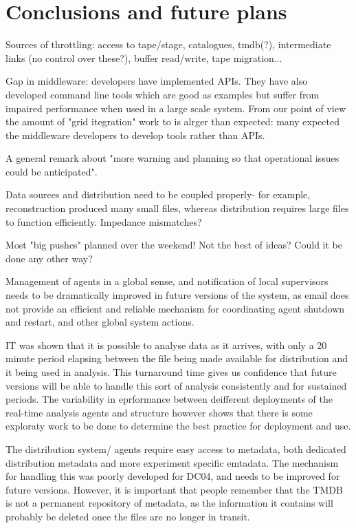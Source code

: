 \documentclass{cmspaper}
\begin{document}
\section{Conclusions and future plans}


Sources of throttling: access to tape/stage, catalogues, tmdb(?), intermediate links (no control over these?), buffer read/write, tape migration...

Gap in middleware: developers have implemented APIs. They have also developed command line tools which are good as examples but suffer from impaired performance when used in a large scale system. From our point of view the amount of "grid itegration" work to is alrger than expected: many expected the middleware developers to develop tools rather than APIs.

A general remark about "more warning and planning so that operational issues could be anticipated".

Data sources and distribution need to be coupled properly- for example, reconstruction produced many small files, whereas distribution requires large files to function efficiently. Impedance mismatches?

Most "big pushes" planned over the weekend! Not the best of ideas? Could it be done any other way?

Management of agents in a global sense, and notification of local supervisors needs to be dramatically improved in future versions of the system, as email does not provide an efficient and reliable mechanism for coordinating agent shutdown and restart, and other global system actions.

IT was shown that it is possible to analyse data as it arrives, with only a 20 minute period elapsing between the file being made available for distribution and it being used in analysis. This turnaround time gives us confidence that future versions will be able to handle this sort of analysis consistently and for sustained periods. The variability in eprformance between deifferent deployments of the real-time analysis agents and structure however shows that there is some exploraty work to be done to determine the best practice for deployment and use.

The distribution system/ agents require easy access to metadata, both dedicated distribution metadata and more experiment specific emtadata. The mechanism for handling this was poorly developed for DC04, and needs to be improved for future versions. However, it is important that people remember that the TMDB is not a permanent repository of metadata, as the information it contains will probably be deleted once the files are no longer in transit.
\end{document}
